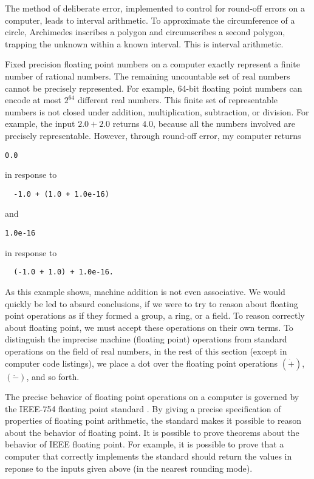 The method of deliberate error, implemented to control for round-off errors on a computer,
leads to interval arithmetic.  To approximate the circumference of a circle, Archimedes inscribes a polygon and circumscribes a second polygon, trapping the unknown within a known interval.  This is interval arithmetic.


Fixed precision 
floating point numbers on a computer exactly represent a finite
number of rational numbers.  The remaining uncountable set of real numbers cannot
be precisely represented.  For example, 64-bit floating point numbers can encode at most
$2^{64}$ different real numbers.    This finite set of representable numbers is not
closed under addition, multiplication, subtraction, or division.  For example,
the input $2.0 + 2.0$ returns $4.0$, because all the numbers involved
are precisely representable.  However, through round-off error, my computer returns 
\begin{verbatim}0.0
\end{verbatim} 
in response to
\begin{verbatim}
  -1.0 + (1.0 + 1.0e-16)
\end{verbatim}
and 
\begin{verbatim}1.0e-16
\end{verbatim} 
in response to 
\begin{verbatim}
  (-1.0 + 1.0) + 1.0e-16.
\end{verbatim}
As this example shows, machine addition is not even associative.  We would quickly be led to absurd
conclusions, if we were to try to reason about floating point operations as if
they formed a group, a ring, or a field.  To reason correctly about floating point, we
must accept these operations on their own terms.  To distinguish the imprecise
machine (floating point) operations from standard operations on the field of real numbers, in the rest of this section (except in computer code listings), 
we place a dot over the floating point operations $(\dot +)$, $(\dot -)$, and so forth.

The precise behavior of floating point operations on a computer is governed by 
the IEEE-754 floating point standard \cite{Gol}.  
By giving a precise specification of properties
of floating point arithmetic, the standard makes it possible to reason about the
behavior of floating point.  It is possible to prove theorems about the behavior
of IEEE floating point.  For example, it is possible to prove that a computer that
correctly implements the standard should return the values in reponse to the inputs
given above (in the nearest rounding mode).  

